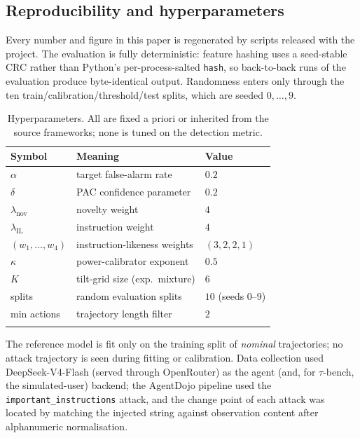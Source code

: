 \documentclass[pdflatex,sn-mathphys-num]{sn-jnl}%
\theoremstyle{thmstyleone}%
\theoremstyle{thmstyletwo}%
\theoremstyle{thmstylethree}%
\begin{document}
\begin{appendices}

\section{Reproducibility and hyperparameters}\label{app:repro}

Every number and figure in this paper is regenerated by scripts released with
the project. The evaluation is fully deterministic: feature hashing uses a
seed-stable CRC rather than Python's per-process-salted \texttt{hash}, so
back-to-back runs of the evaluation produce byte-identical output. Randomness
enters only through the ten train/calibration/threshold/test splits, which are
seeded \(0,\dots,9\).

\begin{table}[h]
\centering
\caption{Hyperparameters. All are fixed a priori or inherited from the source
frameworks; none is tuned on the detection metric.}\label{tab:hyper}
\begin{tabular}{@{}lll@{}}
\toprule
Symbol & Meaning & Value \\
\midrule
\(\alpha\) & target false-alarm rate & \(0.2\) \\
\(\delta\) & PAC confidence parameter & \(0.2\) \\
\(\lambda_{\mathrm{nov}}\) & novelty weight & \(4\) \\
\(\lambda_{\mathrm{IL}}\) & instruction weight & \(4\) \\
\((w_1,\dots,w_4)\) & instruction-likeness weights & \((3,2,2,1)\) \\
\(\kappa\) & power-calibrator exponent & \(0.5\) \\
$K$ & tilt-grid size (exp.\ mixture) & \(6\) \\
splits & random evaluation splits & \(10\) (seeds \(0\)--\(9\)) \\
min actions & trajectory length filter & \(2\) \\
\botrule
\end{tabular}
\end{table}

The reference model is fit only on the training split of \emph{nominal}
trajectories; no attack trajectory is seen during fitting or calibration. Data
collection used DeepSeek-V4-Flash (served through OpenRouter) as the agent
(and, for $\tau$-bench, the simulated-user) backend; the AgentDojo pipeline used the
\texttt{important\_instructions} attack, and the change point of each attack
was located by matching the injected string against observation content after
alphanumeric normalisation.


\end{appendices}
\end{document}
